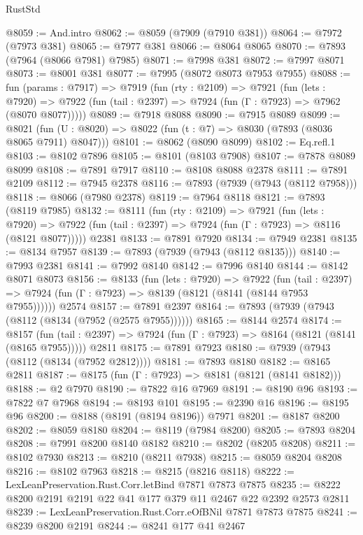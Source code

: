 \begin{lexlean}{RustStd}
\begin{coremodule}
{\begin{coremodule}
{{{{{{{{{{{{{{{{{{{{{{{{{{{{{{{{{{{{{{{{{{{{{{{{{{@8059 := And.intro
@8062 := @8059 (@7909 (@7910 @381))
@8064 := @7972 (@7973 @381)
@8065 := @7977 @381
@8066 := @8064 @8065
@8070 := @7893 (@7964 (@8066 @7981) @7985)
@8071 := @7998 @381
@8072 := @7997 @8071
@8073 := @8001 @381
@8077 := @7995 (@8072 @8073 @7953 @7955)
@8088 := fun (params : @7917) =>
  @7919
    (fun (rty : @2109) =>
    @7921
      (fun (lets : @7920) =>
      @7922 (fun (tail : @2397) => @7924 (fun (Γ : @7923) => @7962 (@8070 @8077)))))
@8089 := @7918 @8088
@8090 := @7915 @8089
@8099 := @8021 (fun (U : @8020) => @8022 (fun (t : @7) => @8030 (@7893 (@8036 @8065 @7911) @8047)))
@8101 := @8062 (@8090 @8099)
@8102 := Eq.refl.{1}
@8103 := @8102 @7896
@8105 := @8101 (@8103 @7908)
@8107 := @7878 @8089 @8099
@8108 := @7891 @7917
@8110 := @8108 @8088 @2378
@8111 := @7891 @2109
@8112 := @7945 @2378
@8116 := @7893 (@7939 (@7943 (@8112 @7958)))
@8118 := @8066 (@7980 @2378)
@8119 := @7964 @8118
@8121 := @7893 (@8119 @7985)
@8132 := @8111
    (fun (rty : @2109) =>
    @7921
      (fun (lets : @7920) =>
      @7922 (fun (tail : @2397) => @7924 (fun (Γ : @7923) => @8116 (@8121 @8077)))))
    @2381
@8133 := @7891 @7920
@8134 := @7949 @2381
@8135 := @8134 @7957
@8139 := @7893 (@7939 (@7943 (@8112 @8135)))
@8140 := @7993 @2381
@8141 := @7992 @8140
@8142 := @7996 @8140
@8144 := @8142 @8071 @8073
@8156 := @8133
    (fun (lets : @7920) =>
    @7922
      (fun (tail : @2397) => @7924 (fun (Γ : @7923) => @8139 (@8121 (@8141 (@8144 @7953 @7955))))))
    @2574
@8157 := @7891 @2397
@8164 := @7893 (@7939 (@7943 (@8112 (@8134 (@7952 (@2575 @7955))))))
@8165 := @8144 @2574
@8174 := @8157
    (fun (tail : @2397) => @7924 (fun (Γ : @7923) => @8164 (@8121 (@8141 (@8165 @7955)))))
    @2811
@8175 := @7891 @7923
@8180 := @7939 (@7943 (@8112 (@8134 (@7952 @2812))))
@8181 := @7893 @8180
@8182 := @8165 @2811
@8187 := @8175 (fun (Γ : @7923) => @8181 (@8121 (@8141 @8182)))
@8188 := @2 @7970
@8190 := @7822 @16 @7969
@8191 := @8190 @96
@8193 := @7822 @7 @7968
@8194 := @8193 @101
@8195 := @2390 @16
@8196 := @8195 @96
@8200 := @8188 (@8191 (@8194 @8196)) @7971
@8201 := @8187 @8200
@8202 := @8059 @8180
@8204 := @8119 (@7984 @8200)
@8205 := @7893 @8204
@8208 := @7991 @8200 @8140 @8182
@8210 := @8202 (@8205 @8208)
@8211 := @8102 @7930
@8213 := @8210 (@8211 @7938)
@8215 := @8059 @8204 @8208
@8216 := @8102 @7963
@8218 := @8215 (@8216 @8118)
@8222 := LexLeanPreservation.Rust.Corr.letBind @7871 @7873 @7875
@8235 := @8222 @8200 @2191 @2191 @22 @41 @177 @379 @11 @2467 @22 @2392 @2573 @2811
@8239 := LexLeanPreservation.Rust.Corr.eOfBNil @7871 @7873 @7875
@8241 := @8239 @8200 @2191
@8244 := @8241 @177 @41 @2467
}}}}}}}}}}}}}}}}}}}}}}}}}}}}}}}}}}}}}}}}}}}}}}}}}}
\end{coremodule}}
\end{coremodule}
\end{lexlean}
